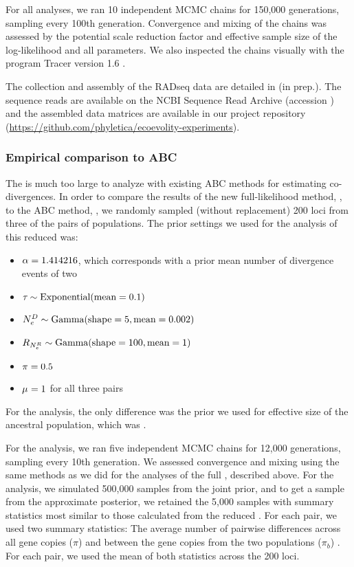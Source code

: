 For all analyses, we ran 10 independent MCMC chains for 150,000 generations,
sampling every 100th generation.
Convergence and mixing of the chains was assessed by the potential scale
reduction factor
\citep[PSRF; the square root of Equation 1.1 in][]{Brooks1998}
and effective sample size
\citep[ESS;][]{Gong2014}
of the log-likelihood and all parameters.
We also inspected the chains visually with the program Tracer version 1.6
\citep{Tracer16}.

The collection and assembly of the  RADseq data are detailed in
\citeauthor{Oaks2018paic} (in prep.).
The sequence reads are available on the NCBI Sequence Read Archive (accession
)
and the assembled data matrices are available in our project repository
(\url{https://github.com/phyletica/ecoevolity-experiments}).

\subsubsection{Empirical comparison to ABC}
The  \dataset is much too large to analyze with existing ABC
methods for estimating co-divergences.
In order to compare the results of the new full-likelihood method, \ecoevolity,
to the ABC method, \dppmsbayes, we randomly sampled (without replacement) 200
loci from three of the pairs of  populations.
The prior settings we used for the \ecoevolity analysis of this reduced
\dataset was:
\begin{itemize}
    \item $\concentration = 1.414216$, which corresponds with a prior mean
        number of divergence events of two
    \item $\divtime \sim \dexponential{0.1}$
    \item $\epopsize[\descendantpopindex{}] \sim \dgamma{5}{0.002}$
    \item $\rootrelativepopsize \sim \dgamma{100}{1}$
    \item $\gfreq = 0.5$
    \item $\murate = 1$ for all three pairs
\end{itemize}
For the \dppmsbayes analysis, the only difference was the prior we used for
effective size of the ancestral population, which was .

For the \ecoevolity analysis, we ran five independent MCMC chains for 12,000
generations, sampling every 10th generation.
We assessed convergence and mixing using the same methods as we did for the
analyses of the full  \dataset, described above.
For the \dppmsbayes analysis, we simulated 500,000 samples from the joint
prior, and to get a sample from the approximate posterior, we retained the
5,000 samples with summary statistics most similar to those calculated
from the reduced  \dataset.
For each pair, we used two summary statistics:
The average number of pairwise differences across all gene copies ($\pi$) and
between the gene copies from the two populations ($\pi_b$) \citep{NeiLi1979}.
For each pair, we used the mean of both statistics across the 200 loci.


